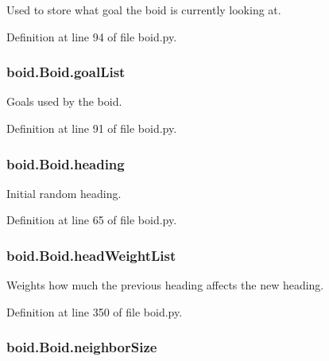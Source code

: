 Used to store what goal the boid is currently looking at. 



Definition at line 94 of file boid.\-py.

\hypertarget{classboid_1_1Boid_a7a3492977220ee1f7623aa9643a2fea4}{
\subsubsection[{goal\-List}]{\setlength{\rightskip}{0pt plus 5cm}boid.\-Boid.\-goal\-List}}\label{classboid_1_1Boid_a7a3492977220ee1f7623aa9643a2fea4}


Goals used by the boid. 



Definition at line 91 of file boid.\-py.

\hypertarget{classboid_1_1Boid_afc4b725b80313dc3604ac36015f84156}{
\subsubsection[{heading}]{\setlength{\rightskip}{0pt plus 5cm}boid.\-Boid.\-heading}}\label{classboid_1_1Boid_afc4b725b80313dc3604ac36015f84156}


Initial random heading. 



Definition at line 65 of file boid.\-py.

\hypertarget{classboid_1_1Boid_a4b192d2b077b52005a82df5d98748190}{
\subsubsection[{head\-Weight\-List}]{\setlength{\rightskip}{0pt plus 5cm}boid.\-Boid.\-head\-Weight\-List}}\label{classboid_1_1Boid_a4b192d2b077b52005a82df5d98748190}


Weights how much the previous heading affects the new heading. 



Definition at line 350 of file boid.\-py.

\hypertarget{classboid_1_1Boid_a4af115e678f7716a2eb87c573e71073c}{
\subsubsection[{neighbor\-Size}]{\setlength{\rightskip}{0pt plus 5cm}boid.\-Boid.\-neighbor\-Size}}\label{classboid_1_1Boid_a4af115e678f7716a2eb87c573e71073c}



